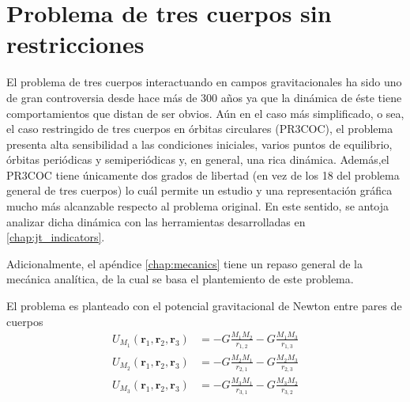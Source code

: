 

\section{Problema de tres cuerpos sin restricciones}
\label{sec:3BP}

El problema de tres cuerpos interactuando en campos gravitacionales ha sido uno de gran controversia desde hace más de 300 años ya que la dinámica de éste tiene comportamientos que distan de ser obvios. Aún en el caso más simplificado, o sea, el caso restringido de tres cuerpos en órbitas circulares (PR3COC), el problema presenta alta sensibilidad a las condiciones iniciales, varios puntos de equilibrio, órbitas periódicas y semiperiódicas y, en general, una rica dinámica. Además,el PR3COC tiene únicamente dos grados de libertad (en vez de los 18 del problema general de tres cuerpos) lo cuál permite un estudio y una representación gráfica mucho más alcanzable respecto al problema original. En este sentido, se antoja analizar dicha dinámica con las herramientas desarrolladas en \ref{chap:jt_indicators}.

Adicionalmente, el apéndice \ref{chap:mecanics} tiene un repaso general de la mecánica analítica, de la cual se basa el plantemiento de este problema. 

El problema es planteado con el potencial gravitacional de Newton entre pares de cuerpos 
\begin{align}
 U_{M_1}(\mathbf{r}_1,\mathbf{r}_2,\mathbf{r}_3) &= -G \frac{M_1 M_2}{r_{1,2}} - G \frac{M_1 M_3}{r_{1,3}} \\
 U_{M_2}(\mathbf{r}_1,\mathbf{r}_2,\mathbf{r}_3) &= -G \frac{M_2 M_1}{r_{2,1}} - G \frac{M_2 M_3}{r_{2,3}} \\
 U_{M_3}(\mathbf{r}_1,\mathbf{r}_2,\mathbf{r}_3) &= -G \frac{M_3 M_1}{r_{3,1}} - G \frac{M_3 M_2}{r_{3,2}}
 \label{eq:3body_potential}
\end{align}

